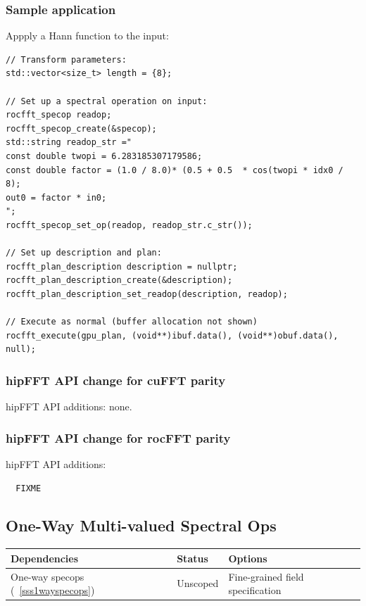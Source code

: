 \documentclass[12pt]{article}
\renewcommand{\(}{\left(}
\renewcommand{\)}{\right)}
\begin{document}
\subsubsection{Sample application}

Appply a Hann function to the input:
\begin{lstlisting}
// Transform parameters:  
std::vector<size_t> length = {8};

// Set up a spectral operation on input:
rocfft_specop readop;
rocfft_specop_create(&specop);
std::string readop_str ="
const double twopi = 6.283185307179586;
const double factor = (1.0 / 8.0)* (0.5 + 0.5  * cos(twopi * idx0 / 8);
out0 = factor * in0;
";
rocfft_specop_set_op(readop, readop_str.c_str());

// Set up description and plan:
rocfft_plan_description description = nullptr;
rocfft_plan_description_create(&description);
rocfft_plan_description_set_readop(description, readop);

// Execute as normal (buffer allocation not shown)
rocfft_execute(gpu_plan, (void**)ibuf.data(), (void**)obuf.data(), null);
\end{lstlisting}


\subsubsection{hipFFT API change for cuFFT parity}

hipFFT API additions: none.

\subsubsection{hipFFT API change for rocFFT parity}
\noindent
hipFFT API additions:
\begin{lstlisting}
  FIXME
\end{lstlisting}

\newpage
\subsection{One-Way Multi-valued Spectral Ops}
\label{ssvecspecops}

\begin{center}
  \begin{tabular}{|l|l|p{5cm}|}
    \hline
    Dependencies & Status & Options \\
    \hline
    One-way specops (~\ref{sss1wayspecops}) & Unscoped   & Fine-grained field specification \\
    \hline
  \end{tabular}
\end{center}
\noindent
\end{document}
